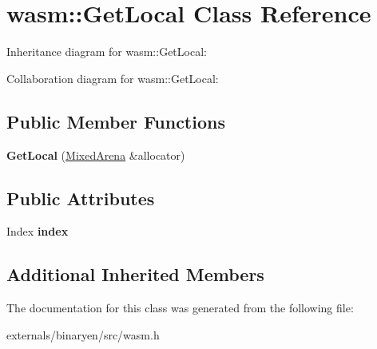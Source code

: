 \hypertarget{classwasm_1_1_get_local}{}\section{wasm\+:\+:Get\+Local Class Reference}
\label{classwasm_1_1_get_local}


Inheritance diagram for wasm\+:\+:Get\+Local\+:


Collaboration diagram for wasm\+:\+:Get\+Local\+:
\subsection*{Public Member Functions}
\begin{DoxyCompactItemize}
\item 
\mbox{\label{classwasm_1_1_get_local_af5ffb04a459d487a8ee37a3c61c6d13b}} 
{\bfseries Get\+Local} (\mbox{\hyperlink{struct_mixed_arena}{Mixed\+Arena}} \&allocator)
\end{DoxyCompactItemize}
\subsection*{Public Attributes}
\begin{DoxyCompactItemize}
\item 
\mbox{\label{classwasm_1_1_get_local_a6342138723cf40941e41b520556cdfcc}} 
Index {\bfseries index}
\end{DoxyCompactItemize}
\subsection*{Additional Inherited Members}


The documentation for this class was generated from the following file\+:\begin{DoxyCompactItemize}
\item 
externals/binaryen/src/wasm.\+h\end{DoxyCompactItemize}
